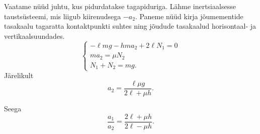 Vaatame nüüd juhtu, kus pidurdatakse tagapiduriga. Lähme inertsiaalsesse taustsüsteemi, mis liigub kiirenudsega $-a_2$. Paneme nüüd kirja jõumementide tasakaalu tagaratta kontaktpunkti suhtes ning jõudude tasakaalud horisontaal- ja vertikaalsuundades.
\begin{equation}
\begin{cases}
  - \ell m g - h m a_2  + 2\ell N_1 =0 \\
  m a_2 = \mu N_2\\
  N_1 + N_2 = mg.
\end{cases}
\end{equation}
Järelikult
\begin{equation}
a_2=\frac{\ell \mu g}{2\ell + \mu h}.
\end{equation}

Seega
\begin{equation}
\frac{a_1}{a_2}= \frac{2\ell + \mu h}{2\ell - \mu h}.
\end{equation}
\probend